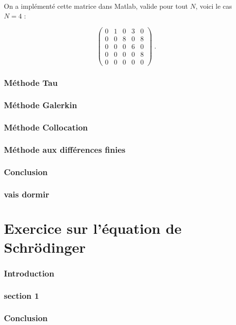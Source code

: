 \documentclass{report}
\begin{document}
On a implémenté cette matrice dans Matlab, valide pour tout $N$, voici le cas $N=4$ :

\begin{equation}
\begin{pmatrix}
0 & 1 & 0 & 3 & 0\\ 
0 & 0 & 8 & 0 & 8\\ 
0 & 0 & 0 & 6 & 0\\ 
0 & 0 & 0 & 0 & 8\\ 
0 & 0 & 0 & 0 & 0
\end{pmatrix} \;.
\end{equation}

\section{Méthode Tau}

\section{Méthode Galerkin}

\section{Méthode Collocation}

\section{Méthode aux différences finies}

\section{Conclusion}

\section{vais dormir}

 \part{Exercice sur l'équation de Schrödinger}
\setcounter{section}{0}
 
\section{Introduction}


\section{section 1}


\section*{Conclusion}
\end{document}

